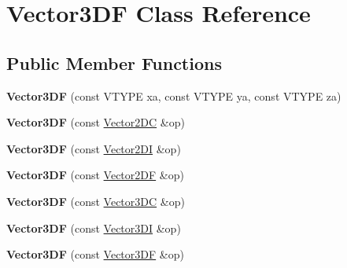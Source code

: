 \hypertarget{class_vector3_d_f}{\section{Vector3\+D\+F Class Reference}
\label{class_vector3_d_f}
}
\subsection*{Public Member Functions}
\begin{DoxyCompactItemize}
\item 
\hypertarget{class_vector3_d_f_a0c4d359671bd41b65beb5468836f512d}{{\bfseries Vector3\+D\+F} (const V\+T\+Y\+P\+E xa, const V\+T\+Y\+P\+E ya, const V\+T\+Y\+P\+E za)}\label{class_vector3_d_f_a0c4d359671bd41b65beb5468836f512d}

\item 
\hypertarget{class_vector3_d_f_a44d3cc8efd84296a0ac1ce51301f2d9d}{{\bfseries Vector3\+D\+F} (const \hyperlink{class_vector2_d_c}{Vector2\+D\+C} \&op)}\label{class_vector3_d_f_a44d3cc8efd84296a0ac1ce51301f2d9d}

\item 
\hypertarget{class_vector3_d_f_a57648fd26ebcb7d2fa32d1c3074988ed}{{\bfseries Vector3\+D\+F} (const \hyperlink{class_vector2_d_i}{Vector2\+D\+I} \&op)}\label{class_vector3_d_f_a57648fd26ebcb7d2fa32d1c3074988ed}

\item 
\hypertarget{class_vector3_d_f_afbd14d2637528da0db0d4114865cdf5a}{{\bfseries Vector3\+D\+F} (const \hyperlink{class_vector2_d_f}{Vector2\+D\+F} \&op)}\label{class_vector3_d_f_afbd14d2637528da0db0d4114865cdf5a}

\item 
\hypertarget{class_vector3_d_f_a914e83954d2c66076b634345df4ce9df}{{\bfseries Vector3\+D\+F} (const \hyperlink{class_vector3_d_c}{Vector3\+D\+C} \&op)}\label{class_vector3_d_f_a914e83954d2c66076b634345df4ce9df}

\item 
\hypertarget{class_vector3_d_f_a77fafdda679350b1dadfcfff9c6f0245}{{\bfseries Vector3\+D\+F} (const \hyperlink{class_vector3_d_i}{Vector3\+D\+I} \&op)}\label{class_vector3_d_f_a77fafdda679350b1dadfcfff9c6f0245}

\item 
\hypertarget{class_vector3_d_f_aab6db6a7d7ad60da33ef5f9cf8f482d3}{{\bfseries Vector3\+D\+F} (const \hyperlink{class_vector3_d_f}{Vector3\+D\+F} \&op)}\label{class_vector3_d_f_aab6db6a7d7ad60da33ef5f9cf8f482d3}


\end{DoxyCompactItemize}
